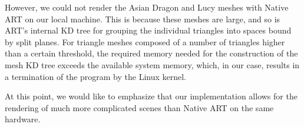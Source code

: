 However, we could not render the Asian Dragon and Lucy meshes with Native ART on our local machine. This is because these meshes are large, and so is ART's internal KD tree for grouping the individual triangles into spaces bound by split planes. For triangle meshes composed of a number of triangles higher than a certain threshold, the required memory needed for the construction of the mesh KD tree exceeds the available system memory, which, in our case, results in a termination of the program by the Linux kernel.

At this point, we would like to emphasize that our implementation allows for the rendering of much more complicated scenes than Native ART on the same hardware.